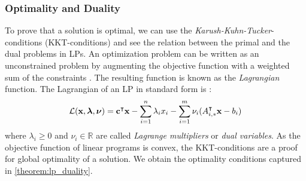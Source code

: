 \subsubsection{Optimality and Duality}
To prove that a solution is optimal, we can use the \textit{Karush-Kuhn-Tucker}-conditions (KKT-conditions) and see the relation between the primal and the dual problems in LPs. 
An optimization problem can be written as an unconstrained problem by augmenting the objective function with a weighted sum of the constraints \cite{boyd_stephen_convex_2004}. The resulting function is known as the \textit{Lagrangian} function.
The Lagrangian of an LP in standard form is \cite{noauthor_numerical_2006}: 
\begin{equation} \label{Eq:lagrangian}
\mathcal{L} (\bold x, \boldsymbol{\lambda}, \boldsymbol \nu) = \bold c^\intercal \bold x - \sum_{i=1}^n \lambda_i x_i - \sum_{i=1}^m \bold \nu_i (A_{i,*}^\intercal \bold x - b_i)
\end{equation} %
where $\lambda_i \geq 0$ and $\nu_i \in \mathbb{R}$ are called \textit{Lagrange multipliers} or \textit{dual variables}.
As the objective function of linear programs is convex, the KKT-conditions are a proof for global optimality of a solution. We obtain the optimality conditions captured in \cref{theorem:lp_duality}. 

